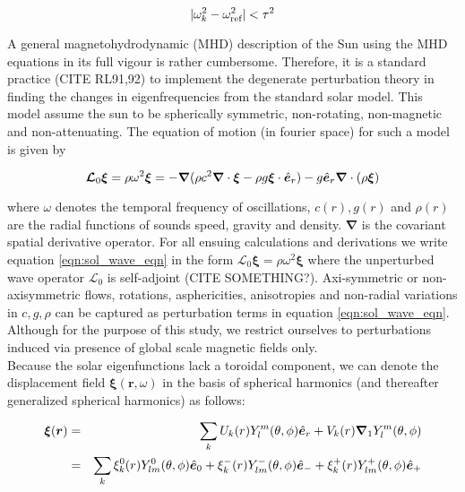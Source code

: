 \begin{equation}
|\omega_k^2 - \omega_{\text{ref}}^2| < \tau^2
\end{equation}


A general magnetohydrodynamic (MHD) description of the Sun using the MHD equations in its full vigour is rather cumbersome. Therefore, it is a standard practice (CITE RL91,92) to implement the degenerate perturbation theory in finding the changes in eigenfrequencies from the standard solar model. This model assume the sun to be spherically symmetric, non-rotating, non-magnetic and non-attenuating. The equation of motion (in fourier space) for such a model is given by \citep{jcd_notes} 

\begin{equation} \label{eqn:sol_wave_eqn}
\bm{\mathcal{L}}_0 \bm{\xi} = \rho \omega^2 \bm{\xi}  = - \bm{\nabla} (\rho c^2 \boldsymbol{\nabla} \cdot \boldsymbol{\xi} - \rho g \boldsymbol{\xi} \cdot \hat{\bm{e}}_{r}) - g \hat{\bm{e}}_{r} \boldsymbol{\nabla} \cdot (\rho \boldsymbol{\xi})
\end{equation}

where $\omega$ denotes the temporal frequency of oscillations, $c(r), g(r)$ and $\rho(r)$ are the radial functions of sounds speed, gravity and density. $\boldsymbol{\nabla}$ is the covariant spatial derivative operator. For all ensuing calculations and derivations we write equation \ref{eqn:sol_wave_eqn} in the form $\mathcal{L}_0 \boldsymbol{\xi} = \rho \omega^2 \boldsymbol{\xi}$ where the unperturbed wave operator $\mathcal{L}_0$ is self-adjoint (CITE SOMETHING?). Axi-symmetric or non-axisymmetric flows, rotations, asphericities, anisotropies and non-radial variations in $c, g, \rho$ can be captured as perturbation terms in equation \ref{eqn:sol_wave_eqn}. Although for the purpose of this study, we restrict ourselves to perturbations induced via presence of global scale magnetic fields only. 
\\

Because the solar eigenfunctions lack a toroidal component, we can denote the displacement field $\boldsymbol{\xi}(\boldsymbol{r},\omega)$ in the basis of spherical harmonics (and thereafter generalized spherical harmonics) as follows:

\begin{eqnarray} \label{eqn: xi_exp}
    \boldsymbol{\xi}(\boldsymbol{r}) &=& \sum_{k} U_{k}(r) Y_l^m(\theta,\phi) \hat{\bm{e}}_{r}
 + V_{k}(r) \boldsymbol{\nabla}_1 Y_l^m(\theta,\phi) \\
     &=& \sum_{k} \xi_{k}^0(r) Y_{lm}^0(\theta,\phi) \hat{\bm{e}}_{0} + \xi_{k}^-(r) Y_{lm}^-(\theta,\phi) \hat{\bm{e}}_{-} + \xi_{k}^+(r) Y_{lm}^+(\theta,\phi) \hat{\bm{e}}_{+}
 \end{eqnarray}
 
